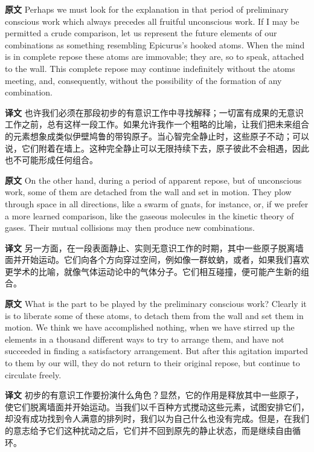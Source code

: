 \documentclass[UTF8,zihao=-4]{ctexart}
\newcommand{\BodyFont}{\fontsize{10.5pt}{15.5pt}\selectfont}
\newcommand{\origlabel}{\textbf{原文}\quad}
\newcommand{\translabel}{\textbf{译文}\quad}
\newenvironment{enblock}{\par\noindent\begingroup\BodyFont\origlabel}{\par\endgroup}
\newenvironment{zhblock}{\par\noindent\begingroup\BodyFont\translabel}{\par\endgroup\vspace{0.35em}}
\begin{document}
\begin{enblock}
Perhaps we must look for the explanation in that period of preliminary conscious work which always precedes all fruitful unconscious work. If I may be permitted a crude comparison, let us represent the future elements of our combinations as something resembling Epicurus's hooked atoms. When the mind is in complete repose these atoms are immovable; they are, so to speak, attached to the wall. This complete repose may continue indefinitely without the atoms meeting, and, consequently, without the possibility of the formation of any combination.
\end{enblock}
\begin{zhblock}
也许我们必须在那段初步的有意识工作中寻找解释；一切富有成果的无意识工作之前，总有这样一段工作。如果允许我作一个粗略的比喻，让我们把未来组合的元素想象成类似伊壁鸠鲁的带钩原子。当心智完全静止时，这些原子不动；可以说，它们附着在墙上。这种完全静止可以无限持续下去，原子彼此不会相遇，因此也不可能形成任何组合。\end{zhblock}

\begin{enblock}
On the other hand, during a period of apparent repose, but of unconscious work, some of them are detached from the wall and set in motion. They plow through space in all directions, like a swarm of gnats, for instance, or, if we prefer a more learned comparison, like the gaseous molecules in the kinetic theory of gases. Their mutual collisions may then produce new combinations.
\end{enblock}
\begin{zhblock}
另一方面，在一段表面静止、实则无意识工作的时期，其中一些原子脱离墙面并开始运动。它们向各个方向穿过空间，例如像一群蚊蚋，或者，如果我们喜欢更学术的比喻，就像气体运动论中的气体分子。它们相互碰撞，便可能产生新的组合。\end{zhblock}

\begin{enblock}
What is the part to be played by the preliminary conscious work? Clearly it is to liberate some of these atoms, to detach them from the wall and set them in motion. We think we have accomplished nothing, when we have stirred up the elements in a thousand different ways to try to arrange them, and have not succeeded in finding a satisfactory arrangement. But after this agitation imparted to them by our will, they do not return to their original repose, but continue to circulate freely.
\end{enblock}
\begin{zhblock}
初步的有意识工作要扮演什么角色？显然，它的作用是释放其中一些原子，使它们脱离墙面并开始运动。当我们以千百种方式搅动这些元素，试图安排它们，却没有成功找到令人满意的排列时，我们以为自己什么也没有完成。但是，在我们的意志给予它们这种扰动之后，它们并不回到原先的静止状态，而是继续自由循环。\end{zhblock}
\end{document}
